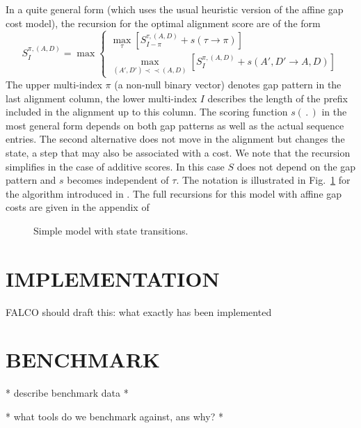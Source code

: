 \documentclass[a4paper,10pt]{article}
\newcommand{\TODO}[1]{\begingroup\color{red}#1\endgroup}
\newcommand{\pprec}{\mathrel{\prec\!\!\!\prec}}
\begin{document}
In a quite general form (which uses the usual heuristic version of the
affine gap cost model), the recursion for the optimal alignment score are
of the form
\begin{equation} 
  S^{\pi,(A,D)}_I = \max 
      \begin{cases}
        \displaystyle\max_{\tau} 
            \left[ S^{\tau,(A,D)}_{I-\pi} + s(\tau\to\pi)
                    \right]
        \\
        \displaystyle\max_{(A',D')\pprec(A,D)}  
                    \left[ S^{\pi,(A,D)}_I + s(A',D'\to A,D)\right]
       \end{cases} 
\label{eq:maxrec}
\end{equation} 
The upper multi-index $\pi$ (a non-null binary vector) denotes gap pattern
in the last alignment column, the lower multi-index $I$ describes the
length of the prefix included in the alignment up to this column. The
scoring function $s(\,.\,)$ in the most general form depends on both gap
patterns as well as the actual sequence entries. The second alternative
does not move in the alignment but changes the state, a step that may also
be associated with a cost. We note that the recursion simplifies in the
case of additive scores. In this case $S$ does not depend on the gap
pattern and $s$ becomes independent of $\tau$. The notation is illustrated
in Fig.~\ref{fig:Marwa} for the algorithm introduced in \cite{AlArab:17a}.
The full recursions for this model with affine gap costs are given in the
appendix of \cite{Retzlaff:18a}

\begin{figure}
  \caption{Simple model with state transitions.}
  \label{fig:Marwa}
\end{figure}






\section{\uppercase{Implementation}}

\TODO{FALCO should draft this: what exactly has been implemented} 


\section{\uppercase{Benchmark}}

\TODO{* describe benchmark data *}

\TODO{* what tools do we benchmark against, ans why? *} 
\end{document}
